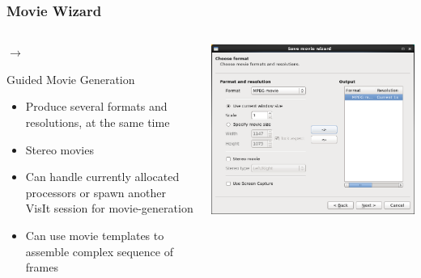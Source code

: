 \begin{frame}
\frametitle{Movie Wizard}
\begin{columns}
\begin{column}{5.75cm}
	\textcolor{DarkBlue}{}
	 $\rightarrow$ 

        \begin{block}{Guided Movie Generation}
        \begin{itemize}
        \item Produce several formats and resolutions, at the same time
	\item Stereo movies
	\item Can handle currently allocated processors or spawn another VisIt session for movie-generation
	\item Can use movie templates to assemble complex sequence of frames
        \end{itemize}
        \end{block}
\end{column}
\begin{column}{5cm}
	\includegraphics[width=\columnwidth]{figs/visit-guis/visit_movieWizard}


\end{column}
\end{columns}
\end{frame}
